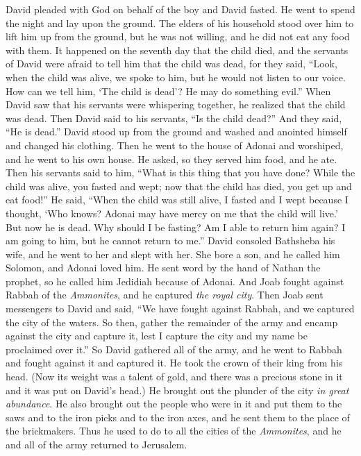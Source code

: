 \begin{biblechapter}
\verse David pleaded with God on behalf of the boy and David fasted. He went to spend the night and lay upon the ground.
\verse The elders of his household stood over him to lift him up from the ground, but he was not willing, and he did not eat any food with them.
\verse It happened on the seventh day that the child died, and the servants of David were afraid to tell him that the child was dead, for they said, “Look, when the child was alive, we spoke to him, but he would not listen to our voice. How can we tell him, ‘The child is dead’? He may do something evil.”
\verse When David saw that his servants were whispering together, he realized that the child was dead. Then David said to his servants, “Is the child dead?” And they said, “He is dead.”
\verse David stood up from the ground and washed and anointed himself and changed his clothing. Then he went to the house of Adonai and worshiped, and he went to his own house. He asked, so they served him food, and he ate.
\verse Then his servants said to him, “What is this thing that you have done? While the child was alive, you fasted and wept; now that the child has died, you get up and eat food!”
\verse He said, “When the child was still alive, I fasted and I wept because I thought, ‘Who knows? Adonai may have mercy on me that the child will live.’
\verse But now he is dead. Why should I be fasting? Am I able to return him again? I am going to him, but he cannot return to me.”
\verse David consoled Bathsheba his wife, and he went to her and slept with her. She bore a son, and he called him Solomon, and Adonai loved him.
\verse He sent word by the hand of Nathan the prophet, so he called him Jedidiah because of Adonai.
 And Joab fought against Rabbah of the \textit{Ammonites}, and he captured \textit{the royal city}.
\verse Then Joab sent messengers to David and said, “We have fought against Rabbah, and we captured the city of the waters.
\verse So then, gather the remainder of the army and encamp against the city and capture it, lest I capture the city and my name be proclaimed over it.”
\verse So David gathered all of the army, and he went to Rabbah and fought against it and captured it.
\verse He took the crown of their king from his head. (Now its weight was a talent of gold, and there was a precious stone in it and it was put on David’s head.) He brought out the plunder of the city \textit{in great abundance}.
\verse He also brought out the people who were in it and put them to the saws and to the iron picks and to the iron axes, and he sent them to the place of the brickmakers. Thus he used to do to all the cities of the \textit{Ammonites}, and he and all of the army returned to Jerusalem.
\end{biblechapter}

